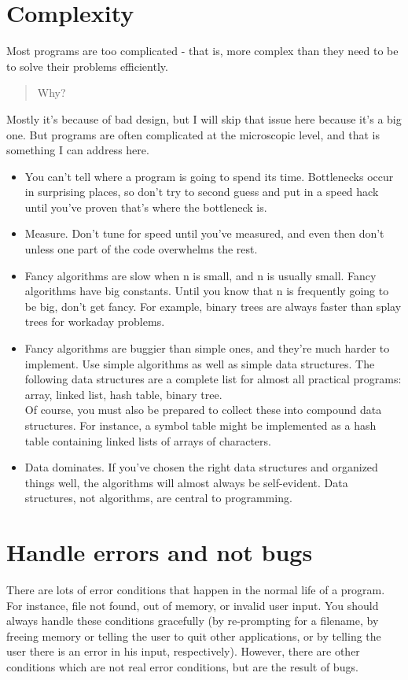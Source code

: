 \documentclass{report}
\begin{document}
\section{Complexity}
Most programs are too complicated - that is, more complex than they need to be to solve their problems efficiently.
\begin{quote}
Why?
\end{quote}
Mostly it's because of bad design, but I will skip that issue here because it's a big one. But programs are often complicated at the microscopic level, and that is something I can address here. 
\begin{itemize}
\item You can't tell where a program is going to spend its time. Bottlenecks occur in surprising places, so don't try to second guess and put in a speed hack until you've proven that's where the bottleneck is. 
\item Measure. Don't tune for speed until you've measured, and even then don't unless one part of the code overwhelms the rest. 
\item Fancy algorithms are slow when n is small, and n is usually small. Fancy algorithms have big constants. Until you know that n is frequently going to be big, don't get fancy. For example, binary trees are always faster than splay trees for workaday problems. 
\item Fancy algorithms are buggier than simple ones, and they're much harder to implement. Use simple algorithms as well as simple data structures. 
The following data structures are a complete list for almost all practical programs: 
array, linked list, hash table, binary tree.\\ 
Of course, you must also be prepared to collect these into compound data structures. For instance, a symbol table might be implemented as a hash table containing linked lists of arrays of characters. 
\item Data dominates. If you've chosen the right data structures and organized things well, the algorithms will almost always be self-evident. Data structures, not algorithms, are central to programming.
\end{itemize} 

\section{Handle errors and not bugs} 
There are lots of error conditions that happen in the normal life of a program. For instance, file not found, out of memory, or invalid user input.
You should always handle these conditions gracefully (by re-prompting for a filename, by freeing memory or telling the user to quit other applications, or by telling the user there is an error in his input, respectively). However, there are other conditions which are not real error conditions, but are the result of bugs.
\end{document}
